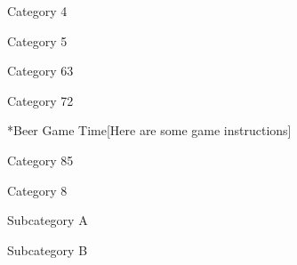 \documentclass[host,printbonus]{pubQuiz} %
\begin{document}
		\begin{PubCategory}{Category 4}
		\end{PubCategory}
		
		\begin{PubCategory}{Category 5}
		\end{PubCategory}
	
	
		\begin{PubCategoryColumns}{Category 6}{3}
		\end{PubCategoryColumns}
		
		\begin{PubCategoryColumns}{Category 7}{2}
		\end{PubCategoryColumns}
		
		\begin{PubCategory}*{Beer Game Time}[Here are some game instructions]
		\end{PubCategory}
		
		\begin{PubCategoryColumns}{Category 8}{5}
		\end{PubCategoryColumns}
		
		\begin{PubCategory}{Category 8}
			\begin{PubSubcategory}{Subcategory A}
			\end{PubSubcategory}
			\begin{PubSubcategory}{Subcategory B}
			\end{PubSubcategory}
		\end{PubCategory}
\end{document}
